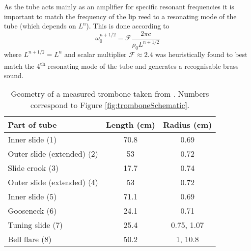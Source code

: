As the tube acts mainly as an amplifier for specific resonant frequencies it is important to match the frequency of the lip reed to a resonating mode of the tube (which depends on $L^n$). This is done according to
\begin{equation}
    \omega_0^{n+1/2} = \mathcal{F}\frac{2\pi c}{\rho_0 L^{n+1/2}}
\end{equation}
where $L^{n+1/2} = L^n$ and scalar multiplier $\mathcal{F} \approx 2.4$  was heuristically found to best match the 4\textsuperscript{th} resonating mode of the tube and generates a recognisable brass sound.
\begin{table}[t]
    \small
    \begin{center}
    \begin{tabular}{|l|c|c|}
        \hline
        Part of tube & Length (cm) & Radius (cm)\\\hline
        Inner slide (1) & 70.8 & 0.69\\
        Outer slide (extended) (2) & 53 & 0.72 
        \\
        Slide crook (3)& 17.7 & 0.74\\
        Outer slide (extended) (4) & 53 & 0.72 
        \\
        Inner slide (5) & 71.1 & 0.69\\
        Gooseneck (6) & 24.1 & 0.71\\
        Tuning slide (7) & 25.4 & 0.75, 1.07\\
        Bell flare (8) & 50.2& 1, 10.8\\\hline
    \end{tabular}
    \caption{Geometry of a measured trombone taken from \cite{Smyth2011}. Numbers correspond to Figure \ref{fig:tromboneSchematic}.\label{tab:geometry}}
    \end{center}
\end{table}



